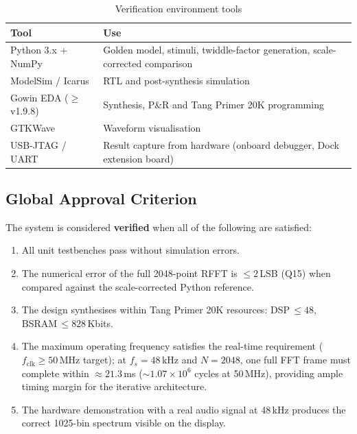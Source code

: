 \documentclass[12pt, a4paper]{article}
\begin{document}
\begin{table}[H]
\centering
\caption{Verification environment tools}
\begin{tabular}{ll}
    \toprule
    \textbf{Tool}  & \textbf{Use} \\
    \midrule
    Python 3.x + NumPy    & Golden model, stimuli, twiddle-factor generation,
                            scale-corrected comparison \\
    ModelSim / Icarus     & RTL and post-synthesis simulation \\
    Gowin EDA ($\geq$v1.9.8)
                          & Synthesis, P\&R and Tang Primer 20K programming \\
    GTKWave               & Waveform visualisation \\
    USB-JTAG / UART       & Result capture from hardware (onboard debugger,
                            Dock extension board) \\
    \bottomrule
\end{tabular}
\end{table}

\subsection{Global Approval Criterion}

The system is considered \textbf{verified} when all of the following are
satisfied:

\begin{enumerate}
    \item All unit testbenches pass without simulation errors.
    \item The numerical error of the full 2048-point RFFT is $\leq 2$\,LSB
          (Q15) when compared against the scale-corrected Python reference.
    \item The design synthesises within Tang Primer 20K resources:
          DSP\,$\leq 48$, BSRAM\,$\leq 828$\,Kbits.
    \item The maximum operating frequency satisfies the real-time requirement
          ($f_\text{clk} \geq 50$\,MHz target); at $f_s = 48$\,kHz and
          $N = 2048$, one full FFT frame must complete within
          $\approx 21.3$\,ms (${\sim}1.07\times10^6$ cycles at 50\,MHz),
          providing ample timing margin for the iterative architecture.
    \item The hardware demonstration with a real audio signal at 48\,kHz
          produces the correct 1025-bin spectrum visible on the display.
\end{enumerate}
\end{document}
